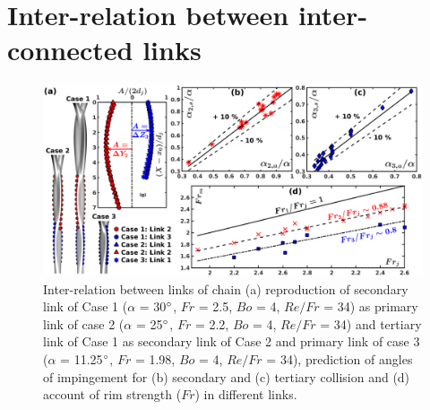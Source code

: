 \documentclass{jfm}
\begin{document}
\section{Inter-relation between inter-connected links} 
\begin{figure}
	\centering
	\includegraphics[width=\linewidth]{Figure7}
	\caption{Inter-relation between links of chain (a) reproduction of secondary link of Case 1 ($\alpha$ = 30$\degree$, $Fr$ = 2.5, $Bo$ = 4, $Re/Fr$ = 34) as primary link of case 2 ($\alpha$ = 25$\degree$, $Fr$ = 2.2, $Bo$ = 4, $Re/Fr$ = 34) and tertiary link of Case 1 as secondary link of Case 2 and primary link of case 3 ($\alpha$ = 11.25$\degree$, $Fr$ = 1.98, $Bo$ = 4, $Re/Fr$ = 34), prediction of angles of impingement for (b) secondary and (c) tertiary collision and (d) account of rim strength ($Fr$) in different links.}
	\label{Figure::secondCollision}%
\end{figure}
\end{document}
